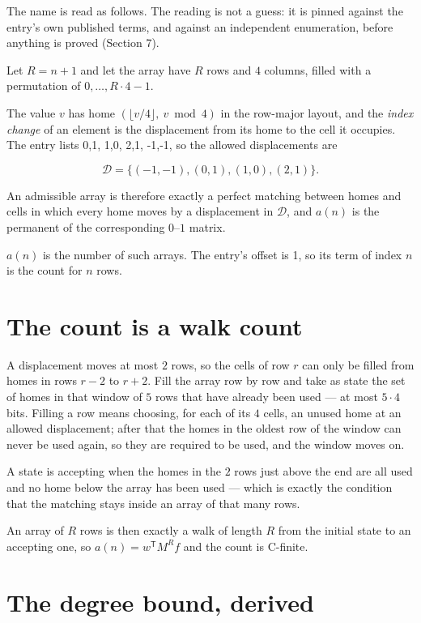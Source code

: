 \documentclass[11pt]{article}
\theoremstyle{definition}
\begin{document}
The name is read as follows. The reading is not a guess: it is pinned against the entry's own published terms, and against an independent enumeration, before anything is proved (Section 7).

Let $R = n + 1$ and let the array have $R$ rows and $4$ columns, filled with a permutation of $0,\dots,R\cdot4-1$.

The value $v$ has home $(\lfloor v/4\rfloor,\ v \bmod 4)$ in the row-major layout, and the {\itshape index change} of an element is the displacement from its home to the cell it occupies. The entry lists 0,1, 1,0, 2,1, -1,-1, so the allowed displacements are

\[\mathcal{D} = \{(-1,-1), (0,1), (1,0), (2,1)\}.\]

An admissible array is therefore exactly a perfect matching between homes and cells in which every home moves by a displacement in $\mathcal{D}$, and $a(n)$ is the permanent of the corresponding $0$--$1$ matrix.

$a(n)$ is the number of such arrays. The entry's offset is 1, so its term of index $n$ is the count for $n$ rows.

\section{The count is a walk count}

A displacement moves at most $2$ rows, so the cells of row $r$ can only be filled from homes in rows $r-2$ to $r+2$. Fill the array row by row and take as state the set of homes in that window of $5$ rows that have already been used --- at most $5\cdot4$ bits. Filling a row means choosing, for each of its $4$ cells, an unused home at an allowed displacement; after that the homes in the oldest row of the window can never be used again, so they are required to be used, and the window moves on.

A state is accepting when the homes in the $2$ rows just above the end are all used and no home below the array has been used --- which is exactly the condition that the matching stays inside an array of that many rows.

An array of $R$ rows is then exactly a walk of length $R$ from the initial state to an accepting one, so $a(n) = w^{\mathsf T}M^{R}f$ and the count is C-finite.

\section{The degree bound, derived}
\end{document}

